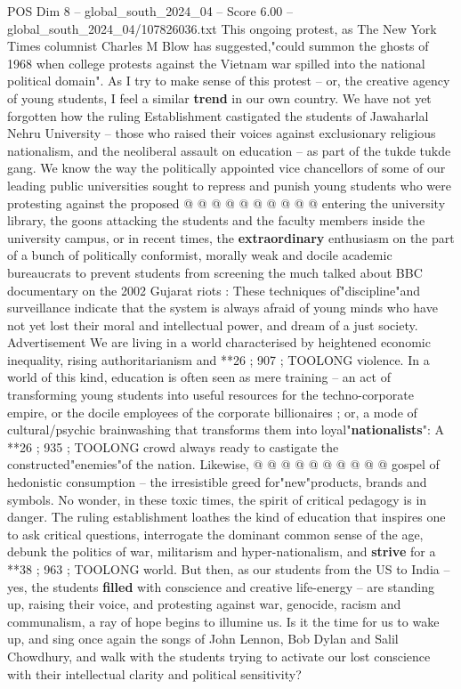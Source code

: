 \begin{textsample}{POS Dim 8 – global\_south\_2024\_04 – Score 6.00 – global\_south\_2024\_04/107826036.txt}
This ongoing protest, as The New York Times columnist Charles M Blow has suggested,"could summon the ghosts of 1968 when college protests against the Vietnam war spilled into the national political domain".
As I try to make sense of this protest -- or, the creative agency of young students, I feel a similar \textbf{trend} in our own country.
We have not yet forgotten how the ruling Establishment castigated the students of Jawaharlal Nehru University -- those who raised their voices against exclusionary religious nationalism, and the neoliberal assault on education -- as part of the tukde tukde gang.
We know the way the politically appointed vice chancellors of some of our leading public universities sought to repress and punish young students who were protesting against the proposed @ @ @ @ @ @ @ @ @ @ entering the university library, the goons attacking the students and the faculty members inside the university campus, or in recent times, the \textbf{extraordinary} enthusiasm on the part of a bunch of politically conformist, morally weak and docile academic bureaucrats to prevent students from screening the much talked about BBC documentary on the 2002 Gujarat riots : These techniques of"discipline"and surveillance indicate that the system is always afraid of young minds who have not yet lost their moral and intellectual power, and dream of a just society.
Advertisement We are living in a world characterised by heightened economic inequality, rising authoritarianism and **26 ; 907 ; TOOLONG violence.
In a world of this kind, education is often seen as mere training -- an act of transforming young students into useful resources for the techno-corporate empire, or the docile employees of the corporate billionaires ; or, a mode of cultural/psychic brainwashing that transforms them into loyal"\textbf{nationalists}": A **26 ; 935 ; TOOLONG crowd always ready to castigate the constructed"enemies"of the nation.
Likewise, @ @ @ @ @ @ @ @ @ @ gospel of hedonistic consumption -- the irresistible greed for"new"products, brands and symbols.
No wonder, in these toxic times, the spirit of critical pedagogy is in danger.
The ruling establishment loathes the kind of education that inspires one to ask critical questions, interrogate the dominant common sense of the age, debunk the politics of war, militarism and hyper-nationalism, and \textbf{strive} for a **38 ; 963 ; TOOLONG world.
But then, as our students from the US to India -- yes, the students \textbf{filled} with conscience and creative life-energy -- are standing up, raising their voice, and protesting against war, genocide, racism and communalism, a ray of hope begins to illumine us.
Is it the time for us to wake up, and sing once again the songs of John Lennon, Bob Dylan and Salil Chowdhury, and walk with the students trying to activate our lost conscience with their intellectual clarity and political sensitivity?

\end{textsample}

